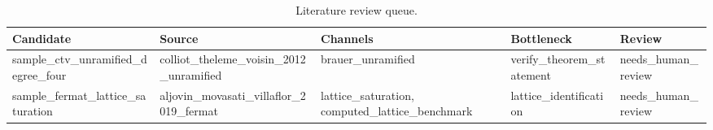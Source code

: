 \begin{table}[h]
\centering
\caption{Literature review queue.}
\label{tab:literature-queue}
\footnotesize
\renewcommand{\arraystretch}{1.18}
\begin{tabular}{|p{}|p{}|p{}|p{}|p{}|}
\hline
Candidate & Source & Channels & Bottleneck & Review \\
\hline
sample\_\allowbreak{}ctv\_\allowbreak{}unramified\_\allowbreak{}degree\_\allowbreak{}four & colliot\_\allowbreak{}theleme\_\allowbreak{}voisin\_\allowbreak{}2012\_\allowbreak{}unramified & brauer\_\allowbreak{}unramified & verify\_\allowbreak{}theorem\_\allowbreak{}statement & needs\_\allowbreak{}human\_\allowbreak{}review \\
sample\_\allowbreak{}fermat\_\allowbreak{}lattice\_\allowbreak{}saturation & aljovin\_\allowbreak{}movasati\_\allowbreak{}villaflor\_\allowbreak{}2019\_\allowbreak{}fermat & lattice\_\allowbreak{}saturation, computed\_\allowbreak{}lattice\_\allowbreak{}benchmark & lattice\_\allowbreak{}identification & needs\_\allowbreak{}human\_\allowbreak{}review \\
\hline
\end{tabular}
\end{table}
